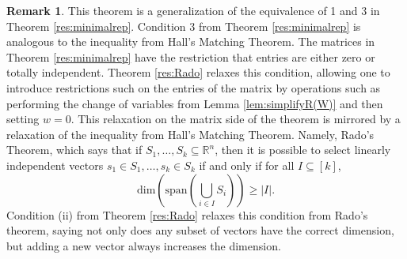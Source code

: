 \documentclass[11pt]{article}
\theoremstyle{remark}
\theoremstyle{definition}
\newtheorem{rmk}[thm]{Remark}
\begin{document}
\begin{appendices}
\begin{rmk}
This theorem is a generalization of the equivalence of 1 and 3 in Theorem \ref{res:minimalrep}. Condition 3 from Theorem \ref{res:minimalrep} is analogous to the inequality from Hall's Matching Theorem.
The matrices in Theorem \ref{res:minimalrep} have the restriction that entries are either zero or totally independent. Theorem \ref{res:Rado} relaxes this condition, allowing one to introduce restrictions such on the entries of the matrix by operations such as performing the change of variables from Lemma \ref{lem:simplifyR(W)} and then setting $w = 0$. This relaxation on the matrix side of the theorem is mirrored by a relaxation of the inequality from Hall's Matching Theorem. Namely, Rado's Theorem, which says that if $S_1, \dots, S_k \subseteq \mathbb{R}^{n}$, then it is possible to select linearly independent vectors $s_1 \in S_1, \dots, s_k \in S_k$ if and only if for all $I \subseteq [k]$,
%
\begin{displaymath}
\mathrm{dim}\left(\mathrm{span}\left( \bigcup_{i \in I} S_i \right) \right) \geq |I|.
\end{displaymath}
%
\noindent
Condition (ii) from Theorem \ref{res:Rado} relaxes this condition from Rado's theorem, saying not only does any subset of vectors have the correct dimension, but adding a new vector always increases the dimension.
\end{rmk}


\end{appendices}
\end{document}
